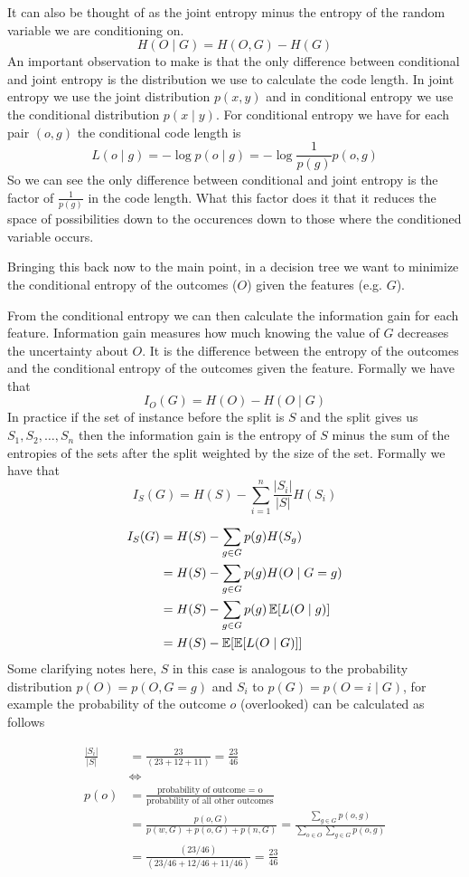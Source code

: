 \documentclass[12pt]{article}
\begin{document}
\smallskip
It can also be thought of as the joint entropy minus the entropy of the random variable we are conditioning on.
\[
    H(O\mid G) = H(O, G) - H(G)
\]
An important observation to make is that the only difference between conditional and joint entropy is the distribution we use to calculate the code length. In joint entropy we use the joint distribution $p(x, y)$ and in conditional entropy we use the conditional distribution $p(x\mid y)$. For conditional entropy we have for each pair $(o, g)$ the conditional code length is
\[
    L(o\mid g) = -\log p(o\mid g) = -\log \frac{1}{p(g)}p(o, g)
\]
So we can see the only difference between conditional and joint entropy is the factor of $\frac{1}{p(g)}$ in the code length. What this factor does it that it reduces the space of possibilities down to the occurences down to those where the conditioned variable occurs. 

\smallskip
Bringing this back now to the main point, in a decision tree we want to minimize the conditional entropy of the outcomes ($O$) given the features (e.g. $G$).

\smallskip
From the conditional entropy we can then calculate the information gain for each feature. Information gain measures how much knowing the value of $G$ decreases the uncertainty about $O$. It is the difference between the entropy of the outcomes and the conditional entropy of the outcomes given the feature. Formally we have that
\[
    I_O(G) = H(O) - H(O\mid G)
\]
In practice if the set of instance before the split is $S$ and the split gives us $S_1, S_2, \ldots, S_n$ then the information gain is the entropy of $S$ minus the sum of the entropies of the sets after the split weighted by the size of the set. Formally we have that
\[
    I_S(G) = H(S) - \sum_{i=1}^n\frac{|S_i|}{|S|}H(S_i)  
\]

\begin{align*}
    I_S(G) &= H(S) - \sum_{g \in G}p(g)H(S_g) \\ 
    &= H(S) - \sum_{g\in G}p(g)H(O\mid G = g) \\  
    &= H(S) - \sum_{g\in G}p(g)\operatorname{\mathbb{E}}[L(O\mid g)] \\ 
    &= H(S) - \operatorname{\mathbb{E}}[\operatorname{\mathbb{E}}[L(O\mid G)]]
\end{align*}
Some clarifying notes here, $S$ in this case is analogous to the probability distribution $p(O) = p(O, G = g)$ and $S_i$ to $p(G) = p(O = i\mid G)$, for example the probability of the outcome $o$ (overlooked) can be calculated as follows 

\begin{align*}
    \frac{|S_i|}{|S|} & = \frac{23}{(23 + 12 + 11)} = \frac{23}{46}\\ 
    & \Leftrightarrow \\ 
    p(o) &= \frac{\text{probability of outcome = o}}{\text{probability of all other outcomes}} \\ 
    & = \frac{p(o, G)}{p(w, G) + p(o, G) + p(n, G)} = \frac{\sum_{g\in G} p(o, g)}{\sum_{o \in O} \sum_{g\in G} p(o, g)} \\
    & = \frac{(23/46)}{(23/46 + 12/46 + 11/46)} = \frac{23}{46}
\end{align*}
\end{document}
